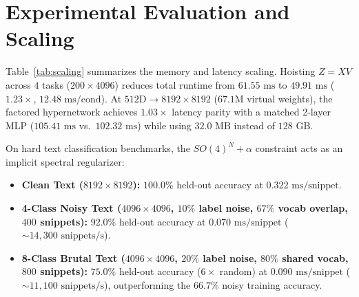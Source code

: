 \documentclass[11pt,twocolumn]{article}
\begin{document}
\section{Experimental Evaluation and Scaling}

\begin{table}[t]
\centering
\caption{Memory, latency, and scaling comparison across dense \texttt{tensordot}, factored $SO(4)^N + \alpha$, and matched MLP baselines.}
\label{tab:scaling}
\small
{}
\end{table}

Table~\ref{tab:scaling} summarizes the memory and latency scaling. Hoisting $Z = X V$ across $4$ tasks ($200 \times 4096$) reduces total runtime from $61.55\text{ ms}$ to $49.91\text{ ms}$ ($1.23\times$, $12.48\text{ ms/cond}$). At $512\text{D} \to 8192 \times 8192$ ($67.1\text{M}$ virtual weights), the factored hypernetwork achieves $1.03\times$ latency parity with a matched 2-layer MLP ($105.41\text{ ms}$ vs.\ $102.32\text{ ms}$) while using $32.0\text{ MB}$ instead of $128\text{ GB}$.

On hard text classification benchmarks, the $SO(4)^N + \alpha$ constraint acts as an implicit spectral regularizer:
\begin{itemize}
    \item \textbf{Clean Text ($8192 \times 8192$):} $100.0\%$ held-out accuracy at $0.322\text{ ms/snippet}$.
    \item \textbf{4-Class Noisy Text ($4096 \times 4096$, $10\%$ label noise, $67\%$ vocab overlap, $400$ snippets):} $92.0\%$ held-out accuracy at $0.070\text{ ms/snippet}$ ($\sim 14{,}300\text{ snippets/s}$).
    \item \textbf{8-Class Brutal Text ($4096 \times 4096$, $20\%$ label noise, $80\%$ shared vocab, $800$ snippets):} $75.0\%$ held-out accuracy ($6\times$ random) at $0.090\text{ ms/snippet}$ ($\sim 11{,}100\text{ snippets/s}$), outperforming the $66.7\%$ noisy training accuracy.
\end{itemize}
\end{document}
